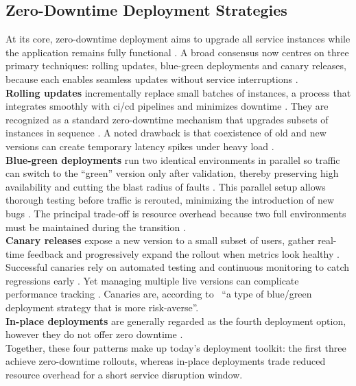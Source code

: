 \documentclass[11pt, a4paper, oneside, listof=totoc]{scrartcl}
\begin{document}
        \subsection{Zero-Downtime Deployment Strategies}\label{subsec:zeroDowntime}
            At its core, zero-downtime deployment aims to upgrade all service instances while the
            application remains fully functional \parencite[n.\,p., inside front matter]{davis2019}.
            A broad consensus now centres on three primary techniques: rolling updates, blue-green
            deployments and canary releases, because each enables seamless updates without service
            interruptions \parencite[p.~1]{rakshit2024}.
            \\
            \textbf{Rolling updates} incrementally replace small batches of instances, a process
            that integrates smoothly with \gls{ci}/\gls{cd} pipelines and minimizes downtime
            \parencite[p.~1]{rakshit2024}.
            They are recognized as a standard zero-downtime mechanism that upgrades subsets of
            instances in sequence \parencite[n.\,p., inside front matter]{davis2019}.
            A noted drawback is that coexistence of old and new versions can create temporary
            latency spikes under heavy load \parencite[p.~1]{rakshit2024}.
            \\
            \textbf{Blue-green deployments} run two identical environments in parallel so traffic
            can switch to the “green” version only after validation, thereby preserving high
            availability and cutting the blast radius of faults \parencite[p.~1]{rakshit2024}.
            This parallel setup allows thorough testing before traffic is rerouted, minimizing the
            introduction of new bugs \parencite[p.~1]{rakshit2024}.
            The principal trade-off is resource overhead because two full environments must be
            maintained during the transition \parencite[p.~1]{rakshit2024}.
            \\
            \textbf{Canary releases} expose a new version to a small subset of users, gather
            real-time feedback and progressively expand the rollout when metrics look healthy
            \parencite[pp.~1--2]{rakshit2024}.
            Successful canaries rely on automated testing and continuous monitoring to catch
            regressions early \parencite[p.~2]{rakshit2024}.
            Yet managing multiple live versions can complicate performance tracking
            \parencite[p.~2]{rakshit2024}.
            Canaries are, according to~\cite[pp.~33--34]{awsOverviewDeploymentOptions}
            \enquote{a type of blue/green deployment strategy that is more risk-averse}.
            \\
            \textbf{In-place deployments} are generally regarded as the fourth deployment option,
            however they do not offer zero downtime
            \parencite[p.~34]{awsOverviewDeploymentOptions}.
            \\
            Together, these four patterns make up today's deployment toolkit: the first three
            achieve zero-downtime rollouts, whereas in-place deployments trade reduced resource
            overhead for a short service disruption window.
\end{document}
